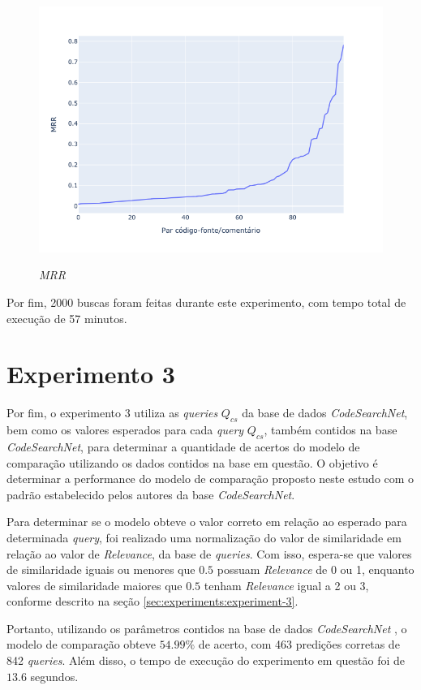 \begin{figure}[H]
  \centering
      \caption{\textit{MRR}}
      \includegraphics[scale=0.6]{imagens/resultados/experiment-2/mrr.png}
      \label{fig:results:experiment-2}
\end{figure}

Por fim, 2000 buscas foram feitas durante este experimento, com tempo total de execução de 57 minutos.

\section{Experimento 3} 
\label{sec:results:experiment-3}
Por fim, o experimento 3 utiliza as \textit{queries} $Q_{cs}$ da base de dados \textit{CodeSearchNet}, bem como os valores esperados para cada \textit{query} $Q_{cs}$, também contidos na base \textit{CodeSearchNet}, para determinar a quantidade de acertos do modelo de comparação utilizando os dados contidos na base em questão. O objetivo é determinar a performance do modelo de comparação proposto neste estudo com o padrão estabelecido pelos autores da base \textit{CodeSearchNet}.

Para determinar se o modelo obteve o valor correto em relação ao esperado para determinada \textit{query}, foi realizado uma normalização do valor de similaridade em relação ao valor de \textit{Relevance}, da base de \textit{queries}. Com isso, espera-se que valores de similaridade iguais ou menores que $0.5$ possuam \textit{Relevance} de 0 ou 1, enquanto valores de similaridade maiores que $0.5$ tenham \textit{Relevance} igual a 2 ou 3, conforme descrito na seção \ref{sec:experiments:experiment-3}.

Portanto, utilizando os parâmetros contidos na base de dados \textit{CodeSearchNet} \cite{Husain2019CodeSearchNetCE}, o modelo de comparação obteve $54.99\%$ de acerto, com 463 predições corretas de 842 \textit{queries}. Além disso, o tempo de execução do experimento em questão foi de $13.6$ segundos.
